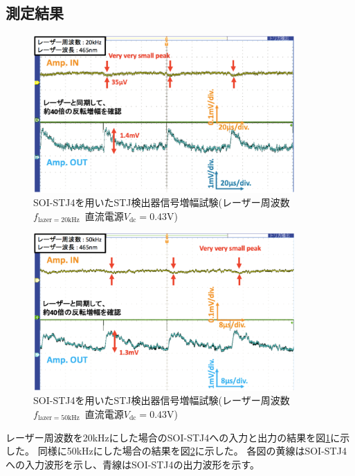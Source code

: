 		\clearpage
		
		\subsection{測定結果}
			\begin{figure}[htbp]
				\begin{center}
					\includegraphics[width=10.0cm]{./Chapter/Chapter4/Picture/STJamp_lazer20k_raw.eps}
					\caption{SOI-STJ4を用いたSTJ検出器信号増幅試験(レーザー周波数$f_{\mathrm{lazer}=20\mathrm{kHz}}$\ 直流電源$V_{\mathrm{dc}}=0.43\mathrm{V}$)}
					\label{fig:STJamp_lazer20k_raw}
				\end{center}
			\end{figure}
		
			\begin{figure}[htbp]
				\begin{center}
					\includegraphics[width=10.0cm]{./Chapter/Chapter4/Picture/STJamp_lazer50k_raw.eps}
					\caption{SOI-STJ4を用いたSTJ検出器信号増幅試験(レーザー周波数$f_{\mathrm{lazer}=50\mathrm{kHz}}$\ 直流電源$V_{\mathrm{dc}}=0.43\mathrm{V}$)}
					\label{fig:STJamp_lazer50k_raw}
				\end{center}
			\end{figure}
			レーザー周波数を20kHzにした場合のSOI-STJ4への入力と出力の結果を図\ref{fig:STJamp_lazer20k_raw}に示した。
			同様に50kHzにした場合の結果を図\ref{fig:STJamp_lazer50k_raw}に示した。
			各図の黄線はSOI-STJ4への入力波形を示し、青線はSOI-STJ4の出力波形を示す。
			
